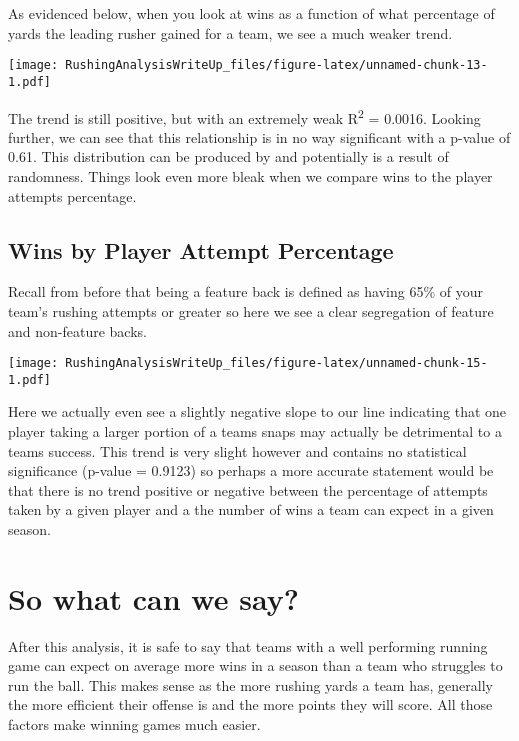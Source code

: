 \documentclass[]{article}
\begin{document}
As evidenced below, when you look at wins as a function of what
percentage of yards the leading rusher gained for a team, we see a much
weaker trend.

\texttt{[image: RushingAnalysisWriteUp\_files/figure-latex/unnamed-chunk-13-1.pdf]}

The trend is still positive, but with an extremely weak
R\textsuperscript{2} = 0.0016. Looking further, we can see that this
relationship is in no way significant with a p-value of 0.61. This
distribution can be produced by and potentially is a result of
randomness. Things look even more bleak when we compare wins to the
player attempts percentage.

\hypertarget{wins-by-player-attempt-percentage}{%
\subsection{Wins by Player Attempt
Percentage}\label{wins-by-player-attempt-percentage}}

Recall from before that being a feature back is defined as having 65\%
of your team's rushing attempts or greater so here we see a clear
segregation of feature and non-feature backs.

\texttt{[image: RushingAnalysisWriteUp\_files/figure-latex/unnamed-chunk-15-1.pdf]}

Here we actually even see a slightly negative slope to our line
indicating that one player taking a larger portion of a teams snaps may
actually be detrimental to a teams success. This trend is very slight
however and contains no statistical significance (p-value = 0.9123) so
perhaps a more accurate statement would be that there is no trend
positive or negative between the percentage of attempts taken by a given
player and a the number of wins a team can expect in a given season.

\hypertarget{so-what-can-we-say}{%
\section{So what can we say?}\label{so-what-can-we-say}}

After this analysis, it is safe to say that teams with a well performing
running game can expect on average more wins in a season than a team who
struggles to run the ball. This makes sense as the more rushing yards a
team has, generally the more efficient their offense is and the more
points they will score. All those factors make winning games much
easier.
\end{document}
